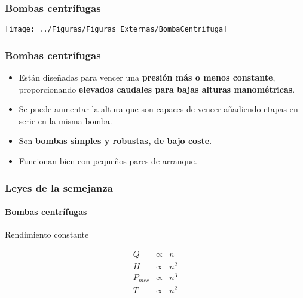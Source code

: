 \documentclass[serif, xcolor=dvipsnames]{beamer}
\begin{document}
\begin{frame}
\frametitle{Bombas centrífugas}

\begin{center}
\texttt{[image: ../Figuras/Figuras\_Externas/BombaCentrifuga]}
\par\end{center}


\end{frame}

\begin{frame}
\frametitle{Bombas centrífugas}
\begin{itemize}
\item Están diseñadas para vencer una \textbf{presión más o menos constante},
proporcionando \textbf{elevados caudales para bajas alturas manométricas}. 
\item Se puede aumentar la altura que son capaces de vencer añadiendo etapas
en serie en la misma bomba.
\item Son \textbf{bombas simples y robustas, de bajo coste}. 
\item Funcionan bien con pequeños pares de arranque.
\end{itemize}

\end{frame}

\begin{frame}
\frametitle{Leyes de la semejanza}


\framesubtitle{Bombas centrífugas}
\begin{block}
{Rendimiento constante}

\begin{center}
\begin{eqnarray*}
Q & \propto & n\\
H & \propto & n^{2}\\
P_{mec} & \propto & n^{3}\\
T & \propto & n^{2}\end{eqnarray*}

\par\end{center}

\end{block}

\end{frame}
\end{document}
